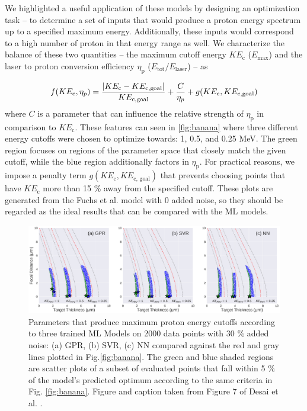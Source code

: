 We highlighted a useful application of these models by designing an optimization task -- to determine a set of inputs that would produce a proton energy spectrum up to a specified maximum energy. Additionally, these inputs would correspond to a high number of proton in that energy range as well. We characterize the balance of these two quantities -- the maximum cutoff energy $KE_\text{c}$ ($E_\text{max}$) and the laser to proton conversion efficiency $\eta_\text{p}$ ($E_\text{tot} / E_\text{laser}$) -- as 

\begin{equation}
	f(KE_{\rm c},\eta_{p}) = \frac{|KE_{\rm c} - KE_{\rm c,goal}|}{KE_{\rm c, goal}} + \frac{C}{\eta_{p}} + g( KE_{\rm c},KE_{\rm c,goal})  \\ \label{eq:fuchsv1_function}
\end{equation}
where $C$ is a parameter that can influence the relative strength of $\eta_\text{p}$ in comparison to $KE_\text{c}$. These features can seen in \autoref{fig:banana} where three different energy cutoffs were chosen to optimize towards: 1, 0.5, and 0.25 MeV. The green region focuses on regions of the parameter space that closely match the given cutoff, while the blue region additionally factors in $\eta_\text{p}$. For practical reasons, we impose a penalty term $g(KE_\text{c}, KE_\text{c, goal})$ that prevents choosing points that have $KE_\text{c}$ more than 15 \% away from the specified cutoff. These plots are generated from the Fuchs et al. model with 0 added noise, so they should be regarded as the ideal results that can be compared with the \gls{ML} models.

\begin{figure}
	\centering 
	\includegraphics[width=0.95\linewidth]{planning/images/paper1/model_optim_noise=30_pts=2000.pdf}
	\caption{Parameters that produce maximum proton energy cutoffs according to three trained ML Models on 2000 data points with 30 $\%$ added noise: (a) GPR, (b) SVR, (c) NN compared against the red and gray lines plotted in Fig.\ref{fig:banana}. The green and blue shaded regions are scatter plots of a subset of evaluated points that fall within 5 $\%$ of the model's predicted optimum according to the same criteria in Fig. \ref{fig:banana}. Figure and caption taken from Figure 7 of Desai et al. \cite{Desai_2024_CPP}.}
	\label{fig:banana3}
\end{figure}

